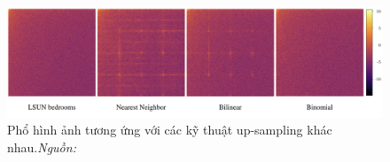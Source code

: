 %
%
%
\begin{figure}[ht!]
	\centering
	\includegraphics[width=1.0\linewidth]{Images/frank-spectrum-up-sampling-1.png}
	\begin{minipage}{0.9\linewidth}
		\caption{Phổ hình ảnh tương ứng với các kỹ thuật \gls{up-sampling} khác nhau.\textit{Nguồn: \cite{Frank2020LeveragingFA}}}
		\label{fig:frank-spectrum-up-sampling-1}
	\end{minipage}
\end{figure}
%

